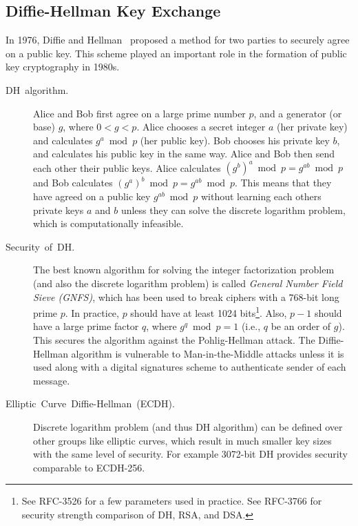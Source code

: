 \documentclass[10pt]{article}
\theoremstyle{plain}
\begin{document}
\subsection{Diffie-Hellman Key Exchange}
\label{sec:diffie-hellman} In 1976, Diffie and Hellman~\cite{Diffie:2006:NDC:2263321.2269104}
proposed a method for two parties to securely agree on a public key.
This scheme played an important role in the formation of public key
cryptography in 1980s.
\begin{description}
	\item [{DH~algorithm.}] Alice and Bob first agree on a large prime number
	$p$, and a generator (or base) $g$, where $0<g<p$. Alice chooses
	a secret integer $a$ (her private key) and calculates $g^{a}\bmod p$
	(her public key). Bob chooses his private key $b$, and calculates
	his public key in the same way. Alice and Bob then send each other
	their public keys. Alice calculates $(g^{b})^{a}\bmod p=g^{ab}\bmod p$
	and Bob calculates $(g^{a})^{b}\bmod p=g^{ab}\bmod p$. This means
	that they have agreed on a public key $g^{ab}\bmod p$ without learning
	each others private keys $a$ and $b$ unless they can solve the discrete
	logarithm problem, which is computationally infeasible.
	\item [{Security~of~DH.}] The best known algorithm for solving the integer
	factorization problem (and also the discrete logarithm problem) is
	called \emph{General Number Field Sieve (GNFS)}, which has been used
	to break ciphers with a 768-bit long prime $p$. In practice, $p$
	should have at least 1024 bits\footnote{See RFC-3526 for a few parameters used in practice. See RFC-3766 for
		security strength comparison of DH, RSA, and DSA.}. Also, $p-1$ should have a large prime factor $q$, where $g^{q}\bmod p=1$
	(i.e., $q$ be an order of $g$). This secures the algorithm against
	the Pohlig-Hellman attack. The Diffie-Hellman algorithm is vulnerable
	to Man-in-the-Middle attacks unless it is used along with a digital
	signatures scheme to authenticate sender of each message.
	\item [{Elliptic~Curve~Diffie-Hellman~(ECDH).}] Discrete logarithm problem
	(and thus DH algorithm) can be defined over other groups like elliptic
	curves, which result in much smaller key sizes with the same level
	of security. For example 3072-bit DH provides security comparable
	to ECDH-256.
\end{description}
\end{document}
